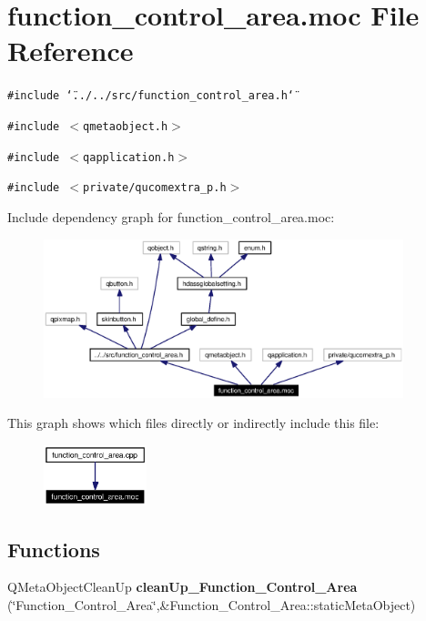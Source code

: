 \section{function\_\-control\_\-area.moc File Reference}
\label{function__control__area_8moc}


{\tt \#include \char`\"{}../../src/function\_\-control\_\-area.h\char`\"{}}\par
{\tt \#include $<$qmetaobject.h$>$}\par
{\tt \#include $<$qapplication.h$>$}\par
{\tt \#include $<$private/qucomextra\_\-p.h$>$}\par


Include dependency graph for function\_\-control\_\-area.moc:\begin{figure}[H]
\begin{center}
\leavevmode
\includegraphics[width=296pt]{function__control__area_8moc__incl}
\end{center}
\end{figure}


This graph shows which files directly or indirectly include this file:\begin{figure}[H]
\begin{center}
\leavevmode
\includegraphics[width=85pt]{function__control__area_8moc__dep__incl}
\end{center}
\end{figure}
\subsection*{Functions}
\begin{CompactItemize}
\item 
QMeta\-Object\-Clean\-Up {\bf clean\-Up\_\-Function\_\-Control\_\-Area} (\char`\"{}Function\_\-Control\_\-Area\char`\"{},\&Function\_\-Control\_\-Area::static\-Meta\-Object)
\end{CompactItemize}


